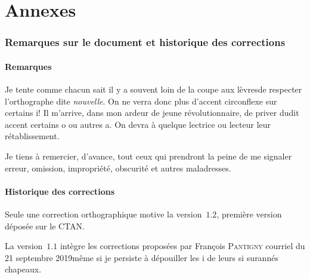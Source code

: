 \documentclass[french]{article}
\begin{document}


\newpage{}

\part{Annexes}
\label{part:annexes}

\printbibliography{}

\printindex{}

\printglossaries

\newpage{}

\section*{Remarques sur le document et historique des corrections}
\label{sec:historique}

\subsection*{Remarques}
\label{sec:remarques}

Je tente \TO comme chacun sait il y a souvent loin de la coupe aux
lèvres\TF de respecter l'orthographe dite \emph{nouvelle}. On ne verra
donc plus d'accent circonflexe sur certains i! Il m'arrive, dans mon
ardeur de jeune révolutionnaire, de priver dudit accent certains o ou
autres a. On devra à quelque lectrice ou lecteur leur rétablissement.

Je tiens à remercier, d'avance, tout ceux qui prendront la peine de me
signaler erreur, omission, impropriété, obscurité et autres
maladresses.  

\subsection*{Historique des corrections}
\label{sec:histocorr}

\begin{etaremune}
\item 
  Seule une correction orthographique motive la version~\(1.2\),
  première version déposée sur le CTAN.

\item 
  La version~\(1.1\) intègre les corrections proposées par François
  \textsc{Pantigny} \TO courriel du 21 septembre 2019\TF même si je
  persiste à dépouiller les i de leurs si surannés chapeaux.
\end{etaremune}
\end{document}
